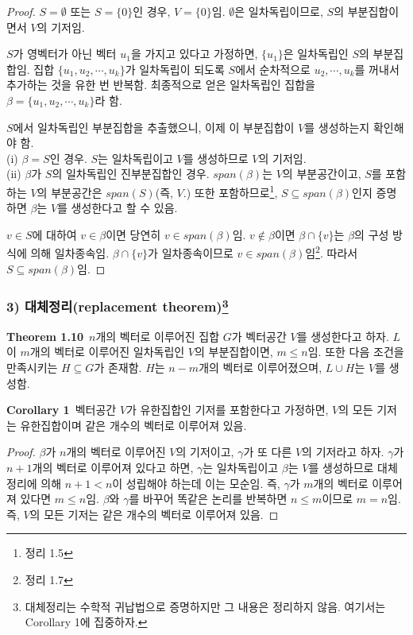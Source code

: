 \documentclass[10pt, a4paper]{article}
\begin{document}
\begin{proof}
$S=\emptyset$ 또는 $S=\{0\}$인 경우, $V=\{0\}$임. $\emptyset$은 일차독립이므로, $S$의 부분집합이면서 $V$의 기저임.

$S$가 영벡터가 아닌 벡터 $u_1$을 가지고 있다고 가정하면, $\{u_1\}$은 일차독립인 $S$의 부분집합임. 집합 $\{u_1,u_2, \cdots ,u_k\}$가 일차독립이 되도록 $S$에서 순차적으로 $u_2, \cdots ,u_k$를 꺼내서 추가하는 것을 유한 번 반복함. 최종적으로 얻은 일차독립인 집합을 $\beta = \{u_1,u_2, \cdots ,u_k\}$라 함.

$S$에서 일차독립인 부분집합을 추출했으니, 이제 이 부분집합이 $V$를 생성하는지 확인해야 함.\\
(i) $\beta = S$인 경우. $S$는 일차독립이고 $V$를 생성하므로 $V$의 기저임.\\
(ii) $\beta$가 $S$의 일차독립인 진부분집합인 경우. $span(\beta)$는 $V$의 부분공간이고, $S$를 포함하는 $V$의 부분공간은 $span(S)$(즉, $V$.) 또한 포함하므로\footnote{정리 1.5}, $S \subseteq span(\beta)$인지 증명하면 $\beta$는 $V$를 생성한다고 할 수 있음.

$v \in S$에 대하여 $v \in \beta$이면 당연히 $v \in span(\beta)$임. $v \notin \beta$이면 $\beta \cap \{v\}$는 $\beta$의 구성 방식에 의해 일차종속임. $\beta \cap \{v\}$가 일차종속이므로 $v \in span(\beta)$임\footnote{정리 1.7}. 따라서 $S \subseteq span(\beta)$임.
\end{proof}

\subsubsection*{3) 대체정리(replacement theorem)\footnote{대체정리는 수학적 귀납법으로 증명하지만 그 내용은 정리하지 않음. 여기서는 Corollary 1에 집중하자.}}
\textbf{Theorem 1.10}\, $n$개의 벡터로 이루어진 집합 $G$가 벡터공간 $V$를 생성한다고 하자. $L$이 $m$개의 벡터로 이루어진 일차독립인 $V$의 부분집합이면, $m \leq n$임. 또한 다음 조건을 만족시키는 $H \subseteq G$가 존재함. $H$는 $n-m$개의 벡터로 이루어졌으며, $L \cup H$는 $V$를 생성함.

\textbf{Corollary 1}\, 벡터공간 $V$가 유한집합인 기저를 포함한다고 가정하면, $V$의 모든 기저는 유한집합이며 같은 개수의 벡터로 이루어져 있음.

\begin{proof}
$\beta$가 $n$개의 벡터로 이루어진 $V$의 기저이고, $\gamma$가 또 다른 $V$의 기저라고 하자. $\gamma$가 $n+1$개의 벡터로 이루어져 있다고 하면, $\gamma$는 일차독립이고 $\beta$는 $V$를 생성하므로 대체정리에 의해 $n+1 < n$이 성립해야 하는데 이는 모순임. 즉, $\gamma$가 $m$개의 벡터로 이루어져 있다면 $m \leq n$임. $\beta$와 $\gamma$를 바꾸어 똑같은 논리를 반복하면 $n \leq m$이므로 $m=n$임. 즉, $V$의 모든 기저는 같은 개수의 벡터로 이루어져 있음.
\end{proof}
\end{document}
